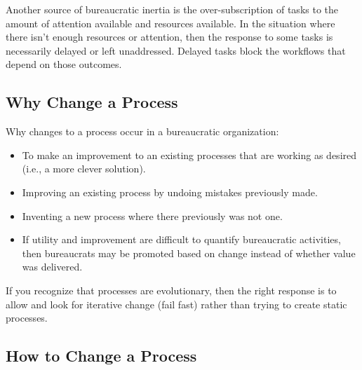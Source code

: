 
Another source of bureaucratic inertia is the over-subscription of tasks to the amount of attention available and resources available. In the situation where there isn't enough resources or attention, then the response to some tasks is necessarily delayed or left unaddressed. Delayed tasks block the workflows that depend on those outcomes. 





\subsection*{Why Change a Process}
Why changes to a process occur in a bureaucratic organization:
\begin{itemize}
    \item To make an improvement to an existing processes that are working as desired (i.e., a more clever solution).
    \item Improving an existing process by undoing mistakes previously made.
    \item Inventing a new process where there previously was not one.
    \item If utility and improvement are difficult to quantify bureaucratic activities, then bureaucrats may be promoted based on change instead of whether value was delivered.
\end{itemize}

If you recognize that processes are evolutionary, then the right response is to allow and look for iterative change (fail fast) rather than trying to create static processes.

\subsection*{How to Change a Process}

